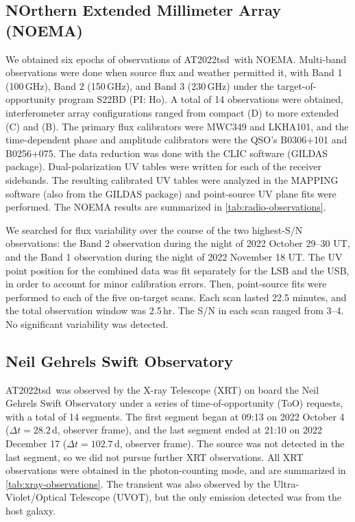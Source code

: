 \documentclass{nature_plusfigure}
\newcommand{\at}{AT2022tsd}
\begin{document}
\begin{methods}
\subsection{NOrthern Extended Millimeter Array (NOEMA)}
\label{Methods:NOEMA}

We obtained six epochs of observations of \at\ with NOEMA. Multi-band observations were done when source flux and weather permitted it, with Band 1 (100\,GHz), Band 2 (150\,GHz), and Band 3 (230\,GHz) under the target-of-opportunity program S22BD (PI: Ho). A total of 14 observations were obtained, interferometer array configurations ranged from compact (D) to more extended (C) and (B). The primary flux calibrators were MWC349 and LKHA101, and the time-dependent phase and amplitude calibrators were the QSO's B0306+101 and B0256+075. The data reduction was done with the CLIC software (GILDAS package\cite{GILDAS}). 
Dual-polarization UV tables were written for each of the receiver sidebands. The resulting calibrated UV tables were analyzed in the MAPPING software (also from the GILDAS package) and point-source UV plane fits were performed.
The NOEMA results are summarized in \ref{tab:radio-observations}.

We searched for flux variability over the course of the two highest-S/N observations: the Band 2 observation during the night of 2022 October 29--30 UT, and the Band 1 observation during the night of 2022 November 18 UT.
The UV point position for the combined data was fit separately for the LSB and the USB, in
order to account for minor calibration errors.
Then, point-source fits were performed to each of the five on-target scans. Each scan lasted 22.5 minutes, and the total observation window was 2.5\,hr. The S/N in each scan ranged from 3--4. No significant variability was detected.

\subsection{Neil Gehrels Swift Observatory}
\label{sec:swift}

\at\ was observed by the X-ray Telescope (XRT\cite{Burrows2005}) on board the Neil Gehrels Swift Observatory under a series of time-of-opportunity (ToO) requests, with a total of 14 segments. The first segment began at 09:13 on 2022 October 4 ($\Delta t=28.2\,$d, observer frame), and the last segment ended at 21:10 on 2022 December 17 ($\Delta t=102.7\,$d, observer frame). The source was not detected in the last segment, so we did not pursue further XRT observations.
All XRT observations were obtained in the photon-counting mode, and are summarized in \ref{tab:xray-observations}.
The transient was also observed by the Ultra-Violet/Optical Telescope (UVOT\cite{Roming2005}), but the only emission detected was from the host galaxy. 


\end{methods}
\end{document}
